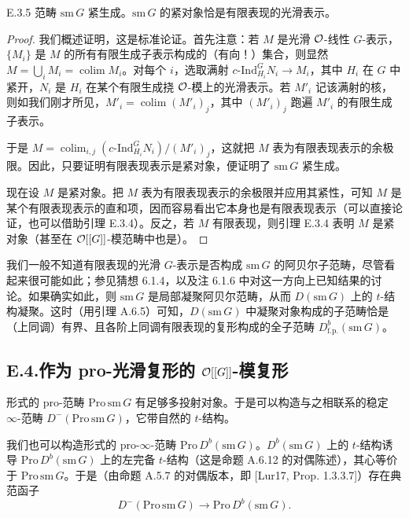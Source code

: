\begin{prop}{E.3.5}\label{thm:a4-20-19}
范畴 $\mathrm{sm}\,G$ 紧生成。$\mathrm{sm}\,G$ 的紧对象恰是有限表现的光滑表示。
\end{prop}

\begin{proof}
我们概述证明，这是标准论证。首先注意：若 $M$ 是光滑 $\mathcal{O}$-线性 $G$-表示，$\{M_i\}$ 是 $M$ 的所有有限生成子表示构成的（有向！）集合，则显然 $M=\bigcup_i M_i=\operatorname*{colim}M_i$。对每个 $i$，选取满射 $c\text{-}\mathrm{Ind}_{H_i}^GN_i\to M_i$，其中 $H_i$ 在 $G$ 中紧开，$N_i$ 是 $H_i$ 在某个有限生成挠 $\mathcal{O}$-模上的光滑表示。若 $M'_i$ 记该满射的核，则如我们刚才所见，$M'_i=\operatorname*{colim}(M'_i)_j$，其中 $(M'_i)_j$ 跑遍 $M'_i$ 的有限生成子表示。


于是 $M=\operatorname*{colim}_{i,j}(c\text{-}\mathrm{Ind}_{H_i}^GN_i)/(M'_i)_j$，这就把 $M$ 表为有限表现表示的余极限。因此，只要证明有限表现表示是紧对象，便证明了 $\mathrm{sm}\,G$ 紧生成。

现在设 $M$ 是紧对象。把 $M$ 表为有限表现表示的余极限并应用其紧性，可知 $M$ 是某个有限表现表示的直和项，因而容易看出它本身也是有限表现表示（可以直接论证，也可以借助引理 E.3.4）。反之，若 $M$ 有限表现，则引理 E.3.4 表明 $M$ 是紧对象（甚至在 $\mathcal{O}[[G]]$-模范畴中也是）。
\end{proof}

我们一般不知道有限表现的光滑 $G$-表示是否构成 $\mathrm{sm}\,G$ 的阿贝尔子范畴，尽管看起来很可能如此；参见猜想 6.1.4，以及注 6.1.6 中对这一方向上已知结果的讨论。如果确实如此，则 $\mathrm{sm}\,G$ 是局部凝聚阿贝尔范畴，从而 $D(\mathrm{sm}\,G)$ 上的 $t$-结构凝聚。这时（用引理 A.6.5）可知，$D(\mathrm{sm}\,G)$ 中凝聚对象构成的子范畴恰是（上同调）有界、且各阶上同调有限表现的复形构成的全子范畴 $D^b_{\mathrm{f.p.}}(\mathrm{sm}\,G)$。

\subsection*{E.4.\quad 作为 pro-光滑复形的 $\mathcal{O}[[G]]$-模复形}

形式的 pro-范畴 $\mathrm{Pro}\,\mathrm{sm}\,G$ 有足够多投射对象。于是可以构造与之相联系的稳定 $\infty$-范畴 $D^-(\mathrm{Pro}\,\mathrm{sm}\,G)$，它带自然的 $t$-结构。

我们也可以构造形式的 pro-$\infty$-范畴 $\mathrm{Pro}\,D^b(\mathrm{sm}\,G)$。$D^b(\mathrm{sm}\,G)$ 上的 $t$-结构诱导 $\mathrm{Pro}\,D^b(\mathrm{sm}\,G)$ 上的左完备 $t$-结构（这是命题 A.6.12 的对偶陈述），其心等价于 $\mathrm{Pro}\,\mathrm{sm}\,G$。于是（由命题 A.5.7 的对偶版本，即 [Lur17, Prop. 1.3.3.7]）存在典范函子
\begin{equation}\tag{E.4.1}\label{eq:a4-20-2}
D^-(\mathrm{Pro}\,\mathrm{sm}\,G)\to\mathrm{Pro}\,D^b(\mathrm{sm}\,G).
\end{equation}

